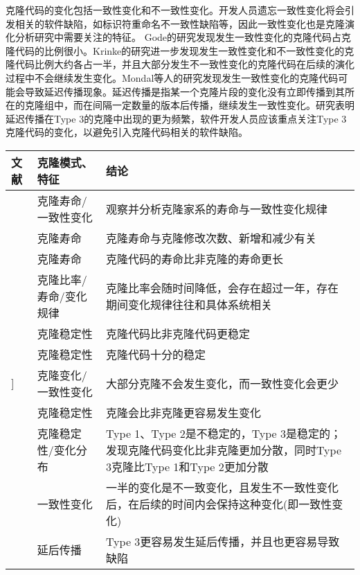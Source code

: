 克隆代码的变化包括一致性变化和不一致性变化。开发人员遗忘一致性变化将会引发相关的软件缺陷，如标识符重命名不一致性缺陷等，因此一致性变化也是克隆演化分析研究中需要关注的特征。 Gode的研究发现发生一致性变化的克隆代码占克隆代码的比例很小\cite{gode2011frequency}。Krinke的研究进一步发现发生一致性变化和不一致性变化的克隆代码比例大约各占一半，并且大部分发生不一致性变化的克隆代码在后续的演化过程中不会继续发生变化\cite{Krinke2007}。Mondal等人的研究发现发生一致性变化的克隆代码可能会导致延迟传播现象。延迟传播是指某一个克隆片段的变化没有立即传播到其所在的克隆组中，而在间隔一定数量的版本后传播，继续发生一致性变化。研究表明延迟传播在Type 3的克隆中出现的更为频繁，软件开发人员应该重点关注Type 3克隆代码的变化，以避免引入克隆代码相关的软件缺陷\cite{mondal2016comparative}。

\begin{table}[htbp]
\centering
{}\vspace{0.5em}\wuhao
\begin{tabularx}{0.9\textwidth}{llX}
\toprule[1.5pt]
文献&克隆模式、特征&结论\\
\midrule[1pt]
\cite{kim2005empirical}&	克隆寿命/一致性变化	&观察并分析克隆家系的寿命与一致性变化规律\\
\cite{cai2011empirical}&	克隆寿命&	克隆寿命与克隆修改次数、新增和减少有关\\
\cite{krinke2011cloned}&	克隆寿命&	克隆代码的寿命比非克隆的寿命更长\\
\cite{bazrafshan2012evolution}\cite{gode2009evolution}&	克隆比率/寿命/变化规律	&克隆比率会随时间降低，会存在超过一年，存在期间变化规律往往和具体系统相关\\
\cite{krinke2008cloned}&克隆稳定性&	克隆代码比非克隆代码更稳定\\
\cite{gode2011clone}\cite{harder2013cloned}&	克隆稳定性&	克隆代码十分的稳定\\
\cite{gode2011frequency}]&	克隆变化/一致性变化&	大部分克隆不会发生变化，而一致性变化会更少\\
\cite{rahman2014change}&	克隆稳定性&	克隆会比非克隆更容易发生变化\\
\cite{mondal2012comparative}\cite{mondal2012dispersion}&	克隆稳定性/变化分布&	Type 1、Type 2是不稳定的，Type 3是稳定的；发现克隆代码变化比非克隆更加分散，同时Type 3克隆比Type 1和Type 2更加分散\\
\cite{Krinke2007}&	一致性变化&	一半的变化是不一致变化，且发生不一致性变化后，在后续的时间内会保持这种变化(即一致性变化)\\
\cite{mondal2016comparative}&	延后传播&	Type 3更容易发生延后传播，并且也更容易导致缺陷\\
\bottomrule[1.5pt]
\end{tabularx}
\end{table}

